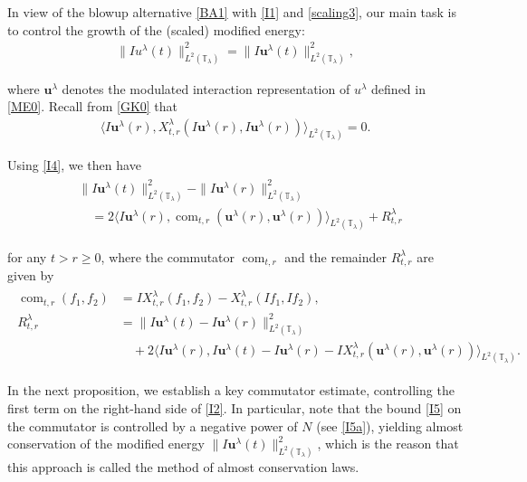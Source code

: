 \documentclass[letterpaper, 11pt,  reqno]{amsart}
\DeclareMathOperator{\com}{com}
\newcommand{\1}{\hspace{0.5mm}\text{I}\hspace{0.5mm}}
\newcommand{\noi}{\noindent}
\newcommand{\T}{\mathbb{T}}
\newcommand{\ld}{\lambda}
\newcommand{\uu}{\mathbf{u}}
\numberwithin{equation}{section}
\numberwithin{theorem}{section}
\begin{document}
In view of the blowup alternative \eqref{BA1}
with \eqref{I1} and \eqref{scaling3}, 
our main task is to control the growth
of the (scaled) modified energy:
\begin{align}
\| I u^\ld(t)\|_{L^2(\T_\ld)}^2 = \| I \uu^\ld(t)\|_{L^2(\T_\ld)}^2, 
\label{ME1}
\end{align}


\noi
where $\uu^\ld$ denotes the modulated interaction representation of $u^\ld$
defined in  \eqref{ME0}.
Recall from \eqref{GK0} that 
\begin{align}
\big\langle 
I \uu^\ld(r) , X^\ld_{t,r} ( I \uu^\ld(r) , I \uu^\ld(r) )
\big\rangle_{L^2(\T_\ld)}= 0.
\label{I4}
\end{align}

\noi
Using \eqref{I4}, 
we then have 
\begin{align}
\begin{split}
& \| I \uu^\ld(t) \|^2_{L^2(\T_\ld)} -  \| I \uu^\ld(r) \|^2_{L^2(\T_\ld)}\\
& \quad =2 \big\langle 
I \uu^\ld(r)  ,   \com_{t, r}(\uu^\ld(r), \uu^\ld(r))
\big\rangle_{L^2(\T_\ld)} 
+ R^\ld_{t,r}
\end{split}
\label{I2}
\end{align}



\noi
for any $t > r \ge 0$, 
where the commutator  $\com_{t, r}$ and the remainder $R^\ld_{t, r}$ are given by 
\begin{align}
\begin{split}
\com_{t, r}(f_1, f_2)
& =  I X^{\ld}_{t,r}(f_1, f_2 ) - X^{\ld}_{t,r}(I f_1, If_2), 
\\
R^\ld_{t,r}
& =\| I  \uu^\ld(t)-I\uu^\ld(r) \|_{L^2(\T_\ld)}^2\\
& \quad 
+
2
\big\langle 
I \uu^\ld(r) , I \uu^\ld(t) - I \uu^\ld(r) -  I X^{\ld}_{t,r}( \uu^\ld(r) , \uu^\ld(r) )
\big\rangle_{L^2(\T_\ld)}.
\end{split}
\label{I3}
\end{align}




\noi
In the next proposition, 
we establish a key commutator estimate, 
controlling the first term on the right-hand side of \eqref{I2}.
In particular,  note that the bound \eqref{I5}
on the commutator is controlled by a negative power of $N$ (see \eqref{I5a}),
yielding almost conservation of the modified energy 
$\| I \uu^\ld(t)\|^2_{L^2(\T_\ld)}$, 
which is the reason that this approach is called the method
of almost conservation laws.
\end{document}
